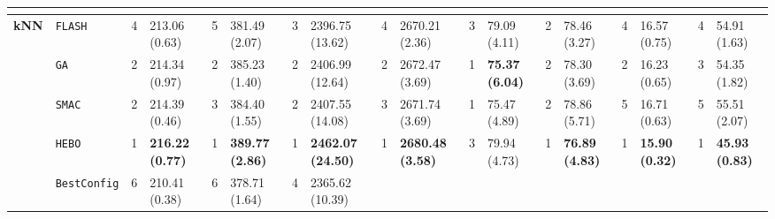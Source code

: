 \begin{tabular}{clllllllllllllllll}
\hline
\multicolumn{1}{l}{\textbf{}} &
    &
    &
    &
    &
    &
    &
    &
    &
    &
    &
    &
    &
    &
    &
    &
    &
    \\ \hline
\multicolumn{1}{c|}{\multirow{7}{*}{\textbf{kNN}}} &
  \multicolumn{1}{l|}{\texttt{FLASH}} &
  4 &
  \multicolumn{1}{l|}{213.06 (0.63)} &
  5 &
  \multicolumn{1}{l|}{381.49 (2.07)} &
  3 &
  \multicolumn{1}{l|}{2396.75 (13.62)} &
  4 &
  \multicolumn{1}{l|}{2670.21 (2.36)} &
  3 &
  \multicolumn{1}{l|}{79.09 (4.11)} &
  2 &
  \multicolumn{1}{l|}{78.46 (3.27)} &
  4 &
  \multicolumn{1}{l|}{16.57 (0.75)} &
  4 &
  54.91 (1.63) \\
\multicolumn{1}{c|}{} &
  \multicolumn{1}{l|}{\texttt{GA}} &
  2 &
  \multicolumn{1}{l|}{214.34 (0.97)} &
  2 &
  \multicolumn{1}{l|}{385.23 (1.40)} &
  2 &
  \multicolumn{1}{l|}{2406.99 (12.64)} &
  2 &
  \multicolumn{1}{l|}{2672.47 (3.69)} &
  \cellcolor{blue!15}1 &
  \multicolumn{1}{l|}{\cellcolor{blue!15}\textbf{75.37 (6.04)}} &
  2 &
  \multicolumn{1}{l|}{78.30 (3.69)} &
  2 &
  \multicolumn{1}{l|}{16.23 (0.65)} &
  3 &
  54.35 (1.82) \\
\multicolumn{1}{c|}{} &
  \multicolumn{1}{l|}{\texttt{SMAC}} &
  2 &
  \multicolumn{1}{l|}{214.39 (0.46)} &
  3 &
  \multicolumn{1}{l|}{384.40 (1.55)} &
  2 &
  \multicolumn{1}{l|}{2407.55 (14.08)} &
  3 &
  \multicolumn{1}{l|}{2671.74 (3.69)} &
  \cellcolor{blue!15}1 &
  \multicolumn{1}{l|}{\cellcolor{blue!15}75.47 (4.89)} &
  2 &
  \multicolumn{1}{l|}{78.86 (5.71)} &
  5 &
  \multicolumn{1}{l|}{16.71 (0.63)} &
  5 &
  55.51 (2.07) \\
\multicolumn{1}{c|}{} &
  \multicolumn{1}{l|}{\texttt{HEBO}} &
  \cellcolor{blue!15}1 &
  \multicolumn{1}{l|}{\cellcolor{blue!15}\textbf{216.22 (0.77)}} &
  \cellcolor{blue!15}1 &
  \multicolumn{1}{l|}{\cellcolor{blue!15}\textbf{389.77 (2.86)}} &
  \cellcolor{blue!15}1 &
  \multicolumn{1}{l|}{\cellcolor{blue!15}\textbf{2462.07 (24.50)}} &
  \cellcolor{blue!15}1 &
  \multicolumn{1}{l|}{\cellcolor{blue!15}\textbf{2680.48 (3.58)}} &
  3 &
  \multicolumn{1}{l|}{79.94 (4.73)} &
  \cellcolor{blue!15}1 &
  \multicolumn{1}{l|}{\cellcolor{blue!15}\textbf{76.89 (4.83)}} &
  \cellcolor{blue!15}1 &
  \multicolumn{1}{l|}{\cellcolor{blue!15}\textbf{15.90 (0.32)}} &
  \cellcolor{blue!15}1 &
  \cellcolor{blue!15}\textbf{45.93 (0.83)} \\
\multicolumn{1}{c|}{} &
  \multicolumn{1}{l|}{\texttt{BestConfig}} &
  6 &
  \multicolumn{1}{l|}{210.41 (0.38)} &
  6 &
  \multicolumn{1}{l|}{378.71 (1.64)} &
  4 &
  \multicolumn{1}{l|}{2365.62 (10.39)} &

\end{tabular}
